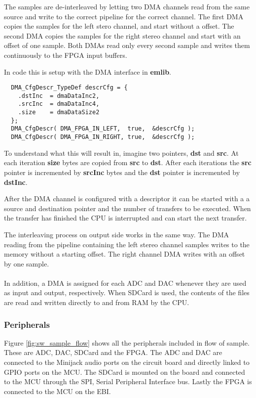 The samples are de-interleaved by letting two DMA channels read from the same
source and write to the correct pipeline for the correct channel. The first DMA
copies the samples for the left stero channel, and start without a offset. The
second DMA copies the samples for the right stereo channel and start with an
offset of one sample. Both DMAs read only every second sample and writes them
continuously to the FPGA input buffers.

In code this is setup with the DMA interface in {\bf emlib}. 
\begin{lstlisting}
  DMA_CfgDescr_TypeDef descrCfg = {
    .dstInc  = dmaDataInc2,
    .srcInc  = dmaDataInc4,
    .size    = dmaDataSize2
  };
  DMA_CfgDescr( DMA_FPGA_IN_LEFT,  true,  &descrCfg );
  DMA_CfgDescr( DMA_FPGA_IN_RIGHT, true,  &descrCfg );
\end{lstlisting}
To understand what this will result in, imagine two pointers, {\bf dst} and {\bf src}. 
At each iteration {\bf size} bytes are copied from {\bf src} to {\bf dst}. After each
iterations the {\bf src} pointer is incremented by {\bf srcInc} bytes and the {\bf dst}
pointer is incremented by {\bf dstInc}. 

After the DMA channel is configured with a descriptor it can be started with a 
a source and destination pointer and the number of transfers to be executed. 
When the transfer has finished the CPU is interrupted and can start the next transfer.

The interleaving process on output side works in the same way. The DMA reading
from the pipeline containing the left stereo channel samples writes to the
memory without a starting offset. The right channel DMA writes with an offset by
one sample.

\paragraph{}
In addition, a DMA is assigned for each ADC and DAC whenever they are used as
input and output, respectively. When SDCard is used, the contents of the files
are read and written directly to and from RAM by the CPU.


\subsubsection{Peripherals}


Figure \ref{fig:sw_sample_flow} shows all the peripherals included in flow of sample. 
These are ADC, DAC, SDCard and the FPGA. The ADC and DAC are connected to the Minijack
audio ports on the circuit board and directly linked to GPIO ports on the MCU. The SDCard
is mounted on the board and connected to the MCU through the SPI, Serial Peripheral Interface
bus. Lastly the FPGA is connected to the MCU on the EBI.

